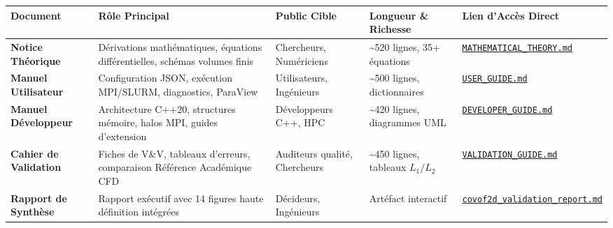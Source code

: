\documentclass[
  french,
]{article}
\newcounter{none} %
\begin{document}
{\def\LTcaptype{none} %
\begin{longtable}[]{@{}
  >{\raggedright\arraybackslash}p{}
  >{\raggedright\arraybackslash}p{}
  >{\raggedright\arraybackslash}p{}
  >{\centering\arraybackslash}p{}
  >{\raggedright\arraybackslash}p{}@{}}
\toprule\noalign{}
\begin{minipage}[b]{\linewidth}\raggedright
Document
\end{minipage} & \begin{minipage}[b]{\linewidth}\raggedright
Rôle Principal
\end{minipage} & \begin{minipage}[b]{\linewidth}\raggedright
Public Cible
\end{minipage} & \begin{minipage}[b]{\linewidth}\centering
Longueur \& Richesse
\end{minipage} & \begin{minipage}[b]{\linewidth}\raggedright
Lien d'Accès Direct
\end{minipage} \\
\midrule\noalign{}
\endhead
\bottomrule\noalign{}
\endlastfoot
\textbf{Notice Théorique} & Dérivations mathématiques, équations
différentielles, schémas volumes finis & Chercheurs, Numériciens &
\textasciitilde520 lignes, 35+ équations &
\href{file:///Users/elhadjiibrahimathiam/Documents/PROJET_ANTIGRAVITY/COVOF_2D-C++/docs/MATHEMATICAL_THEORY.md}{\texttt{MATHEMATICAL\_THEORY.md}} \\
\textbf{Manuel Utilisateur} & Configuration JSON, exécution MPI/SLURM,
diagnostics, ParaView & Utilisateurs, Ingénieurs & \textasciitilde500
lignes, dictionnaires &
\href{file:///Users/elhadjiibrahimathiam/Documents/PROJET_ANTIGRAVITY/COVOF_2D-C++/docs/USER_GUIDE.md}{\texttt{USER\_GUIDE.md}} \\
\textbf{Manuel Développeur} & Architecture C++20, structures mémoire,
halos MPI, guides d'extension & Développeurs C++, HPC &
\textasciitilde420 lignes, diagrammes UML &
\href{file:///Users/elhadjiibrahimathiam/Documents/PROJET_ANTIGRAVITY/COVOF_2D-C++/docs/DEVELOPER_GUIDE.md}{\texttt{DEVELOPER\_GUIDE.md}} \\
\textbf{Cahier de Validation} & 13 Fiches de V\&V, tableaux d'erreurs,
comparaison Référence Académique CFD & Auditeurs qualité, Chercheurs &
\textasciitilde450 lignes, tableaux \(L_1/L_2\) &
\href{file:///Users/elhadjiibrahimathiam/Documents/PROJET_ANTIGRAVITY/COVOF_2D-C++/docs/VALIDATION_GUIDE.md}{\texttt{VALIDATION\_GUIDE.md}} \\
\textbf{Rapport de Synthèse} & Rapport exécutif avec 14 figures haute
définition intégrées & Décideurs, Ingénieurs & Artéfact interactif &
\href{file:///Users/elhadjiibrahimathiam/.gemini/antigravity/brain/d891e39d-85a0-4365-9d86-f527fe9e206c/covof2d_validation_report.md}{\texttt{covof2d\_validation\_report.md}} \\
\end{longtable}
}
\end{document}

